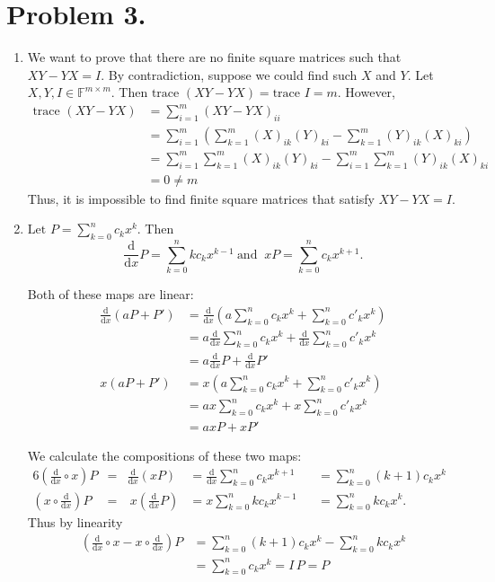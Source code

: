 \documentclass[11pt]{amsart}
\newcommand{\field}[1]{\mathbb{#1}}
\newcommand{\ud}{\mathrm{d}}
\begin{document}
\section*{Problem 3.}
\begin{enumerate}
\item We want to prove that there are no finite square matrices such
  that $XY-YX=I$. By contradiction, suppose we could find such $X$ and
  $Y$. Let $X,Y,I\in\field{F}^{m\times m}$. Then $\textrm{trace }
  (XY-YX) = \textrm{trace } I = m$. However,
\begin{align*}
  \textrm{trace } (XY-YX) &= \sum_{i=1}^m (XY-YX)_{ii} \\
  &=\sum_{i=1}^m \left(\sum_{k=1}^{m}(X)_{ik}(Y)_{ki}-
    \sum_{k=1}^{m}(Y)_{ik}(X)_{ki}\right)\\
  &={\sum_{i=1}^m\sum_{k=1}^{m}(X)_{ik}(Y)_{ki}-
    \sum_{i=1}^m\sum_{k=1}^{m}(Y)_{ik}(X)_{ki}}\\
  &= 0 \not = m
\end{align*}
Thus, it is impossible to find finite square matrices that satisfy
$XY-YX=I$.\\[1ex]

\item $\textrm{Let } P=\sum_{k=0}^{n}c_k x^k.$ Then
  $$\frac{\ud}{\ud x} P=\sum_{k=0}^{n}k c_k x^{k-1} \ \textrm{
    and } \ x P=\sum_{k=0}^{n}c_k x^{k+1}.$$

Both of these maps are linear:
\begin{align*}
  \frac{\ud}{\ud x}(aP + P')&=\frac{\ud}{\ud
    x}(a\sum_{k=0}^{n}c_k x^k + \sum_{k=0}^{n}c'_k x^k)\\
  &={a\frac{\ud}{\ud x}\sum_{k=0}^{n}c_k x^k +
    \frac{\ud}{\ud x} \sum_{k=0}^{n}c'_k x^k}\\
  &=a\frac{\ud}{\ud x}P+\frac{\ud}{\ud x}P'\\[2ex]
  x(aP + P')&=x(a\sum_{k=0}^{n}c_k x^k + \sum_{k=0}^{n}c'_k x^k)\\
  &=ax\sum_{k=0}^{n}c_k x^k +x\sum_{k=0}^{n}c'_k x^k\\
  &=axP+xP'
\end{align*}

We calculate the compositions of these two maps:
\begin{alignat*}{6} \left(\frac{\ud}{\ud x} \circ x \right) P
  &= &\frac{\ud}{\ud x}\left(xP\right)&=\frac{\ud}{\ud
    x}\sum_{k=0}^{n}c_k
  x^{k+1}&&=\sum_{k=0}^{n}(k+1)c_k x^{k} \quad\\[0.5ex]
  \left(x \circ \frac{\ud}{\ud x}\right) P &=& \ x\left(\frac{\ud}{\ud
      x}P\right)&=x\sum_{k=0}^{n}k c_k
  x^{k-1}&&=\sum_{k=0}^{n}k c_k x^{k}.
\end{alignat*}
 Thus by linearity
 \begin{align*}
   \left(\frac{\ud}{\ud x} \circ x - x \circ \frac{\ud}{\ud
       x}\right)P&=\sum_{k=0}^{n}(k+1)c_k x^{k} - \sum_{k=0}^{n}k c_k x^{k}\\
   &=\sum_{k=0}^{n}c_k x^{k}=I\,P = P
\end{align*}


\end{enumerate}
\end{document}
